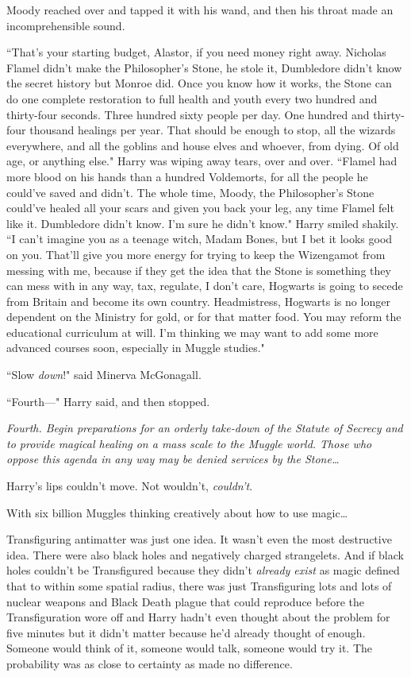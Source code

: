 Moody reached over and tapped it with his wand, and then his throat made an incomprehensible sound.

``That's your starting budget, Alastor, if you need money right away. Nicholas Flamel didn't make the Philosopher's Stone, he stole it, Dumbledore didn't know the secret history but Monroe did. Once you know how it works, the Stone can do one complete restoration to full health and youth every two hundred and thirty-four seconds. Three hundred sixty people per day. One hundred and thirty-four thousand healings per year. That should be enough to stop, all the wizards everywhere, and all the goblins and house elves and whoever, from dying. Of old age, or anything else." Harry was wiping away tears, over and over. ``Flamel had more blood on his hands than a hundred Voldemorts, for all the people he could've saved and didn't. The whole time, Moody, the Philosopher's Stone could've healed all your scars and given you back your leg, any time Flamel felt like it. Dumbledore didn't know. I'm sure he didn't know." Harry smiled shakily. ``I can't imagine you as a teenage witch, Madam Bones, but I bet it looks good on you. That'll give you more energy for trying to keep the Wizengamot from messing with me, because if they get the idea that the Stone is something they can mess with in any way, tax, regulate, I don't care, Hogwarts is going to secede from Britain and become its own country. Headmistress, Hogwarts is no longer dependent on the Ministry for gold, or for that matter food. You may reform the educational curriculum at will. I'm thinking we may want to add some more advanced courses soon, especially in Muggle studies."

``Slow \emph{down}!" said Minerva McGonagall.

``Fourth---" Harry said, and then stopped.

\emph{Fourth. Begin preparations for an orderly take-down of the Statute of Secrecy and to provide magical healing on a mass scale to the Muggle world. Those who oppose this agenda in any way may be denied services by the Stone{\ldots}}

Harry's lips couldn't move. Not wouldn't, \emph{couldn't}.

With six billion Muggles thinking creatively about how to use magic{\ldots}

Transfiguring antimatter was just one idea. It wasn't even the most destructive idea. There were also black holes and negatively charged strangelets. And if black holes couldn't be Transfigured because they didn't \emph{already exist} as magic defined that to within some spatial radius, there was just Transfiguring lots and lots of nuclear weapons and Black Death plague that could reproduce before the Transfiguration wore off and Harry hadn't even thought about the problem for five minutes but it didn't matter because he'd already thought of enough. Someone would think of it, someone would talk, someone would try it. The probability was as close to certainty as made no difference.

